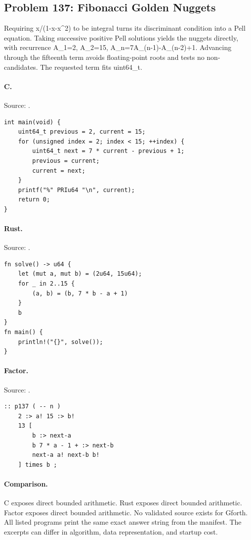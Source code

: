 \subsection{Problem 137: Fibonacci Golden Nuggets}
\label{walkthrough:p137}
Requiring x/(1-x-x\textasciicircum{}2) to be integral turns its discriminant condition into a Pell equation. Taking successive positive Pell solutions yields the nuggets directly, with recurrence A\_1=2, A\_2=15, A\_n=7A\_(n-1)-A\_(n-2)+1. Advancing through the fifteenth term avoids floating-point roots and tests no non-candidates. The requested term fits uint64\_t.

\paragraph{C.} Source: .
\begin{lstlisting}
int main(void) {
    uint64_t previous = 2, current = 15;
    for (unsigned index = 2; index < 15; ++index) {
        uint64_t next = 7 * current - previous + 1;
        previous = current;
        current = next;
    }
    printf("%" PRIu64 "\n", current);
    return 0;
}
\end{lstlisting}

\paragraph{Rust.} Source: .
\begin{lstlisting}
fn solve() -> u64 {
    let (mut a, mut b) = (2u64, 15u64);
    for _ in 2..15 {
        (a, b) = (b, 7 * b - a + 1)
    }
    b
}
fn main() {
    println!("{}", solve());
}
\end{lstlisting}

\paragraph{Factor.} Source: .
\begin{lstlisting}
:: p137 ( -- n )
    2 :> a! 15 :> b!
    13 [
        b :> next-a
        b 7 * a - 1 + :> next-b
        next-a a! next-b b!
    ] times b ;
\end{lstlisting}

\paragraph{Comparison.}
C exposes direct bounded arithmetic. Rust exposes direct bounded arithmetic. Factor exposes direct bounded arithmetic.
No validated source exists for Gforth.
All listed programs print the same exact answer string from the manifest. The excerpts can differ in algorithm, data representation, and startup cost.

